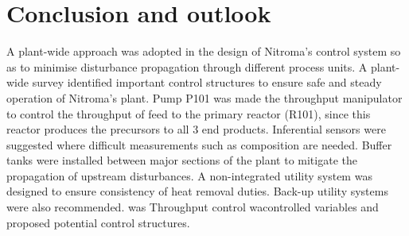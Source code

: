 \section{Conclusion and outlook}
A plant-wide approach was adopted in the design of Nitroma's control system so as to minimise disturbance propagation through different process units. A plant-wide survey identified important control structures to ensure safe and steady operation of Nitroma's plant. Pump P101 was made the throughput manipulator to control the throughput of feed to the primary reactor (R101), since this reactor produces the precursors to all 3 end products. Inferential sensors were suggested where difficult measurements such as composition are needed. Buffer tanks were installed between major sections of the plant to mitigate the propagation of upstream disturbances. A non-integrated utility system was designed to ensure consistency of heat removal duties. Back-up utility systems were also recommended. was Throughput control wacontrolled variables and proposed potential control structures.